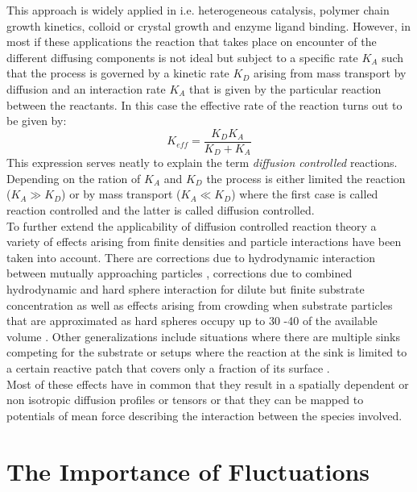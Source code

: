 This approach is widely applied in i.e. heterogeneous catalysis, polymer chain growth kinetics, colloid or crystal growth and enzyme ligand binding. However, in most if these applications the reaction that takes place on encounter of the different diffusing components is not ideal but subject to a specific rate $K_A$ such that the process is governed by a kinetic rate $K_D$ arising from mass transport by diffusion and an interaction rate $K_A$ that is given by the particular reaction between the reactants. In this case the effective rate of the reaction turns out to be given by:
\begin{equation}
    K_{eff} = \frac{K_D K_A}{K_D + K_A}
    \label{KeffIntro}
\end{equation}
This expression serves neatly to explain the term \emph{diffusion controlled} reactions. Depending on the ration of $K_A$ and $K_D$ the process is either limited the reaction ($K_A \gg K_D$) or by mass transport ($K_A \ll K_D$) where the first case is called reaction controlled and the latter is called diffusion controlled. \\

To further extend the applicability of diffusion controlled reaction theory a variety of effects arising from finite densities and particle interactions have been taken into account. There are corrections due to hydrodynamic interaction between mutually approaching particles \cite{Friedman1966, Wolyes1976}, corrections due to combined hydrodynamic and hard sphere interaction for dilute but finite substrate concentration \cite{Dzubiella2005} as well as effects arising from crowding when substrate particles that are approximated as hard spheres occupy up to 30 -40 of the available volume \cite{Dorsaz2010}. Other generalizations include situations where there are multiple sinks competing for the substrate \cite{Reck1968a, Reck1968b} or setups where the reaction at the sink is limited to a certain reactive patch that covers only a fraction of its surface \cite{schmitz1972role, schurr1976, shoup1981diffusion, shoup1982role}. \\
Most of these effects have in common that they result in a spatially dependent or non isotropic diffusion profiles or tensors  or that they can be mapped to potentials of mean force describing the interaction between the species involved.
\newpage
\section{The Importance of Fluctuations}

